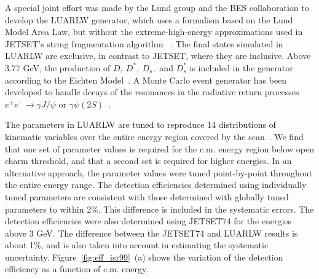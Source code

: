 A special joint effort was made by the Lund 
group and the BES collaboration to develop the LUARLW generator,
which uses a formalism based on the 
Lund Model Area Law, but without the extreme-high-energy 
approximations used in JETSET's string fragmentation algorithm
~\cite{bo}. 
The final states simulated in LUARLW are exclusive, 
in contrast to JETSET, where they are inclusive. 
%
%
Above 3.77 GeV, 
the production of $D,~D^*,~D_s,$ and $D_s^*$
is included in the generator according to the Eichten 
Model~\cite{eichiten}.
A Monte Carlo event generator has been developed
to handle decays of the resonances in the radiative return processes
$e^+e^- \rightarrow \gamma J/\psi$ or $\gamma \psi(2S)$~\cite{chenjc}.

The parameters in LUARLW are tuned to reproduce
14 distributions of kinematic variables 
over the entire energy region covered by the scan~\cite{huhm}.
We find that one set of parameter values is required for the c.m. energy
region below open charm threshold, and that a second set
is required for higher energies.
In an alternative approach, the parameter values 
were tuned point-by-point throughout the
entire energy range.  
The detection efficiencies 
determined using individually tuned parameters are consistent with 
those determined with globally tuned parameters to within 2\%.   
This difference is included in the systematic errors. 
The detection efficiencies were also determined using JETSET74 for 
the energies above 3 GeV. 
The difference between the JETSET74 and LUARLW results is about 1\%,
and is also taken into account in estimating the systematic 
uncertainty.  Figure~\ref{fig:eff_isr99}~(a) shows the variation 
of the detection efficiency as a function of c.m. energy. 

